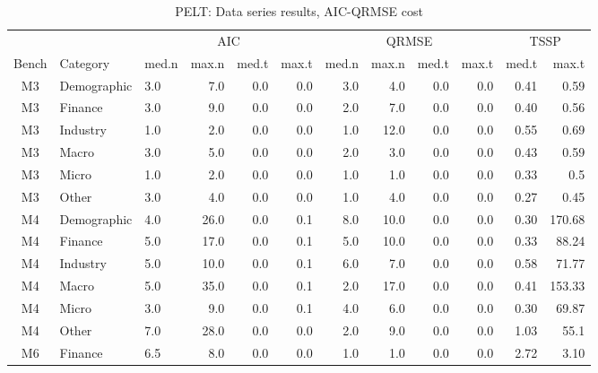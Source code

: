 \documentclass[preprints,article,submit,pdftex,moreauthors]{Definitions/mdpi}
\begin{document}
\begin{table}[ht]
	\centering
	\caption{PELT: Data series results, AIC-QRMSE cost}\label{tab:PELTseriesAICQRMSE}%
	\begin{tabular}{@{}cl|lr|rr|rr|rr|rr}
		\toprule
		& & \multicolumn{4}{c|}{AIC} & \multicolumn{4}{c}{QRMSE} & \multicolumn{2}{|c}{TSSP} \\
		Bench & Category & med.n & max.n & med.t & max.t & med.n & max.n & med.t & max.t & med.t & max.t \\
		\midrule
		M3 & Demographic  & 3.0 & 7.0 & 0.0 & 0.0 & 3.0 & 4.0 & 0.0 & 0.0 & 0.41 & 0.59\\
		M3 & Finance      & 3.0 & 9.0 & 0.0 & 0.0 & 2.0 & 7.0 & 0.0 & 0.0 & 0.40 & 0.56\\
		M3 & Industry     & 1.0 & 2.0 & 0.0 & 0.0 & 1.0 & 12.0 & 0.0 & 0.0 & 0.55 & 0.69\\
		M3 & Macro        & 3.0 & 5.0 & 0.0 & 0.0 & 2.0 & 3.0 & 0.0 & 0.0 & 0.43 & 0.59\\
		M3 & Micro        & 1.0 & 2.0 & 0.0 & 0.0 & 1.0 & 1.0 & 0.0 & 0.0 & 0.33 & 0.5\\
		M3 & Other        & 3.0 & 4.0 & 0.0 & 0.0 & 1.0 & 4.0 & 0.0 & 0.0 & 0.27 & 0.45\\
		M4 & Demographic & 4.0 & 26.0 & 0.0 & 0.1 & 8.0 & 10.0 & 0.0 & 0.0 & 0.30 & 170.68\\
		M4 & Finance & 5.0 & 17.0 & 0.0 & 0.1 & 5.0 & 10.0 & 0.0 & 0.0 & 0.33 & 88.24 \\
		M4 & Industry & 5.0 & 10.0 & 0.0 & 0.1 & 6.0 & 7.0 & 0.0 & 0.0 & 0.58 & 71.77\\
		M4 & Macro & 5.0 & 35.0 & 0.0 & 0.1 & 2.0 & 17.0 & 0.0 & 0.0 & 0.41 & 153.33 \\
		M4 & Micro & 3.0 & 9.0 & 0.0 & 0.1 & 4.0 & 6.0 & 0.0 & 0.0 & 0.30 & 69.87\\
		M4 & Other & 7.0 & 28.0 & 0.0 & 0.0 & 2.0 & 9.0 & 0.0 & 0.0 & 1.03 & 55.1\\
		M6 & Finance & 6.5 & 8.0 & 0.0 & 0.0 & 1.0 & 1.0 & 0.0 & 0.0 & 2.72 & 3.10\\
		\bottomrule
	\end{tabular}
\end{table}
\end{document}
